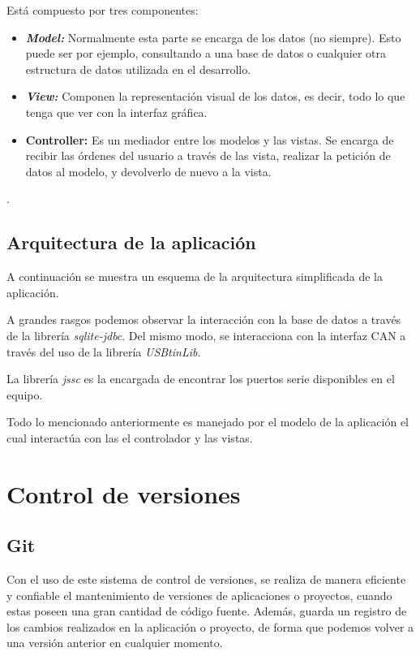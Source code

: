 Está compuesto por tres componentes:
\begin{itemize}
\item
\textit{\textbf{Model: }} Normalmente esta parte se encarga de los datos (no siempre). Esto puede ser por ejemplo, consultando a una base de datos o cualquier otra estructura de datos utilizada en el desarrollo.
\item
\textit{\textbf{View: }} Componen la representación visual de los datos, es decir, todo lo que tenga que ver con la interfaz gráfica.
\item
\textbf{\textbf{Controller: }} Es un mediador entre los modelos y las vistas. Se encarga de recibir las órdenes del usuario a través de las vista, realizar la petición de datos al modelo, y devolverlo de nuevo a la vista.
\end{itemize}


.

\subsection{Arquitectura de la aplicación}\label{arquitectura_app}

A continuación se muestra un esquema de la arquitectura simplificada de la aplicación.


A grandes rasgos podemos observar la interacción con la base de datos a través de la librería \emph{sqlite-jdbc}. Del mismo modo, se interacciona con la interfaz CAN a través del uso de la librería \emph{USBtinLib}.

La librería \emph{jssc} es la encargada de encontrar los puertos serie disponibles en el equipo.

Todo lo mencionado anteriormente es manejado por el modelo de la aplicación el cual interactúa con las el controlador y las vistas.

\section{Control de versiones}\label{control_de_versiones}

\subsection{Git}\label{git}

Con el uso de este sistema de control de versiones, se realiza de manera eficiente y confiable el mantenimiento de versiones de aplicaciones o proyectos, cuando estas poseen una gran cantidad de código fuente. Además, guarda un registro de los cambios realizados en la aplicación o proyecto, de forma que podemos volver a una versión anterior en cualquier momento.

